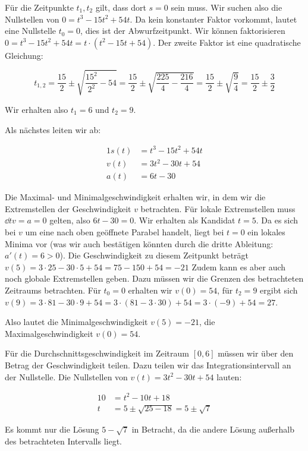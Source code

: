 \item Für die Zeitpunkte $t_1,t_2$ gilt, dass dort $s=0$ sein muss. Wir suchen also die Nullstellen von $0=t^3-15t^2+54t$. Da kein konstanter Faktor vorkommt, lautet eine Nullstelle $t_0=0$, dies ist der Abwurfzeitpunkt. Wir können faktorisieren $0=t^3-15t^2+54t=t \cdot (t^2-15t+54)$. Der zweite Faktor ist eine quadratische Gleichung:

$$
	t_{1,2} = \frac{15}{2} \pm \sqrt{\frac{15^2}{2^2} - 54} = \frac{15}{2} \pm \sqrt{\frac{225}{4} - \frac{216}{4}} = \frac{15}{2} \pm  \sqrt{\frac{9}{4}} = \frac{15}{2} \pm \frac{3}{2}
$$

Wir erhalten also $t_1 = 6$ und $t_2 = 9$.

Als nächstes leiten wir ab:

\begin{alignat*}{1}
	s(t) &= t^3-15t^2+54t \\
	v(t) &= 3t^2-30t+54 \\
	a(t)&= 6t-30
\end{alignat*}

Die Maximal- und Minimalgeschwindigkeit erhalten wir, in dem wir die Extremstellen der Geschwindigkeit $v$ betrachten. Für lokale Extremstellen muss $\dd{}{t}v=a=0$ gelten, also $6t-30=0$. Wir erhalten als Kandidat $t=5$. Da es sich bei $v$ um eine nach oben geöffnete Parabel handelt, liegt bei $t=0$ ein lokales Minima vor (was wir auch bestätigen könnten durch die dritte Ableitung: $a'(t)=6>0$). Die Geschwindigkeit zu diesem Zeitpunkt beträgt $v(5)=3\cdot 25-30\cdot 5+54=75-150+54=-21$ Zudem kann es aber auch noch globale Extremstellen geben. Dazu müssen wir die Grenzen des betrachteten Zeitraums betrachten. Für $t_0=0$ erhalten wir $v(0)=54$, für $t_2=9$ ergibt sich $v(9)=3\cdot 81-30\cdot 9+54 = 3\cdot(81-3\cdot 30)+54 = 3\cdot (-9) + 54 = 27$.

Also lautet die Minimalgeschwindigkeit $v(5)=-21$, die Maximalgeschwindigkeit $v(0)=54$.

Für die Durchschnittsgeschwindigkeit im Zeitraum $[0,6]$ müssen wir über den Betrag der Geschwindigkeit teilen. Dazu teilen wir das Integrationsintervall an der Nullstelle. Die Nullstellen von $v(t)=3t^2-30t+54$ lauten:

\begin{alignat*}{1}
	0 &= t^2-10t+18 \\
	t &= 5 \pm \sqrt{25-18} = 5 \pm \sqrt{7}
\end{alignat*}

Es kommt nur die Lösung $5 - \sqrt{7}$ in Betracht, da die andere Lösung außerhalb des betrachteten Intervalls liegt.

